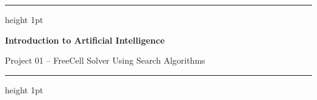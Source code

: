 \begin{titlepage}
\begin{center}
    \vspace{0.5cm}
    \hrule height 1pt
    \vspace{0.5cm}
    
    {\Huge\bfseries\color{titlecolor} Introduction to Artificial Intelligence\par}
    \vspace{0.5cm}
    
    {\Large Project 01 – FreeCell Solver Using Search Algorithms\par}
    \vspace{0.5cm}
    
    \hrule height 1pt
    \vspace{1cm}
\vspace{6.0cm}
    \
\end{center}
\end{titlepage}


